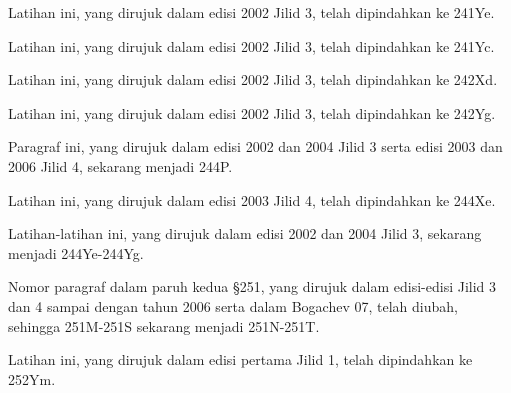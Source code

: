  Latihan ini, yang dirujuk dalam
edisi 2002 Jilid 3, telah dipindahkan ke 241Ye.

 Latihan ini, yang dirujuk dalam
edisi 2002 Jilid 3, telah dipindahkan ke 241Yc.

 Latihan ini,
yang dirujuk dalam edisi 2002 Jilid 3, telah dipindahkan ke 242Xd.

 Latihan ini, yang dirujuk
dalam edisi 2002 Jilid 3, telah dipindahkan ke 242Yg.

 Paragraf ini, yang dirujuk dalam edisi
2002 dan 2004 Jilid 3 serta edisi 2003 dan 2006 Jilid 4, sekarang menjadi
244P.

 Latihan ini, yang dirujuk dalam edisi
2003 Jilid 4, telah dipindahkan ke 244Xe.

 Latihan-latihan ini,
yang dirujuk dalam edisi 2002 dan 2004 Jilid 3, sekarang menjadi
244Ye-244Yg.  %

 Nomor paragraf dalam paruh kedua \S2{}51, yang dirujuk
dalam edisi-edisi Jilid 3 dan 4 sampai dengan tahun 2006 serta dalam {\smc
Bogachev 07}, telah diubah, sehingga 2{}51M-2{}51S sekarang menjadi
251N-251T.

%

 Latihan ini, yang dirujuk dalam edisi pertama
Jilid 1, telah dipindahkan ke 252Ym.





